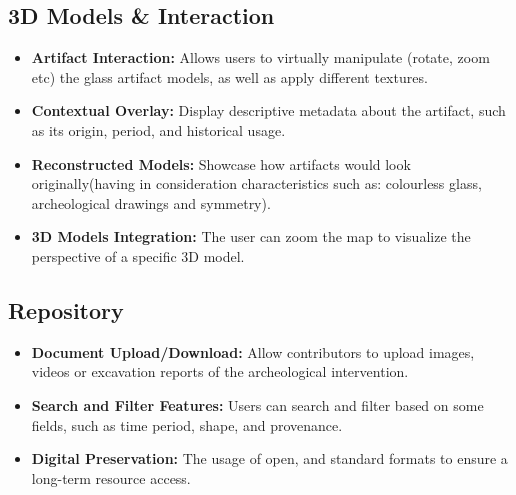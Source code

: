 \subsection*{\gls{3D} Models \& Interaction}
\begin{itemize}
    \item \textbf{Artifact Interaction:} Allows users to virtually manipulate (rotate, zoom etc) the glass artifact models, as well as apply different textures.
    \item \textbf{Contextual Overlay:} Display descriptive metadata about the artifact, such as its origin, period, and historical usage.
    \item \textbf{Reconstructed Models:} Showcase how artifacts would look originally(having in consideration characteristics such as: colourless glass, archeological drawings and symmetry).
    \item \textbf{3D Models Integration:} The user can zoom the map to visualize the perspective of a specific \gls{3D} model.
\end{itemize}

\subsection*{Repository}
\begin{itemize}
    \item \textbf{Document Upload/Download:} Allow contributors to upload images, videos or excavation reports of the archeological intervention.
    \item \textbf{Search and Filter Features:} Users can search and filter based on some fields, such as time period, shape, and provenance.
    \item \textbf{Digital Preservation:} The usage of open, and standard formats to ensure a long-term resource access.
\end{itemize}


